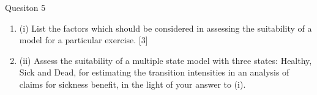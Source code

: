 \documentclass[a4paper,12pt]{article}
\begin{document}
Quesiton 5
\begin{enumerate}
\item (i) List the factors which should be considered in assessing the suitability of a
model for a particular exercise.
[3]
\item (ii) Assess the suitability of a multiple state model with three states: Healthy, Sick
and Dead, for estimating the transition intensities in an analysis of claims for
sickness benefit, in the light of your answer to (i).
\end{enumerate}












\newpage
\end{document}
